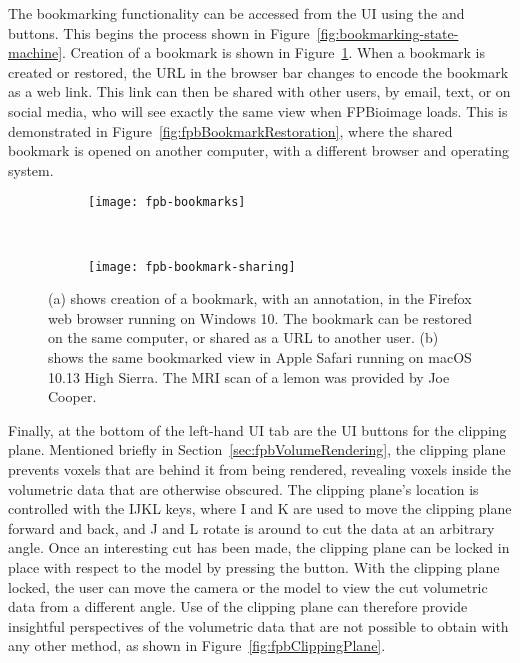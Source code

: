 The bookmarking functionality can be accessed from the UI using the  and  buttons.
This begins the process shown in Figure~\ref{fig:bookmarking-state-machine}.
Creation of a bookmark is shown in Figure~\ref{fig:fpbBookmarkCreation}.
When a bookmark is created or restored, the URL in the browser bar changes to encode the bookmark as a web link.
This link can then be shared with other users, by email, text, or on social media, who will see exactly the same view when FPBioimage loads.
This is demonstrated in Figure~\ref{fig:fpbBookmarkRestoration}, where the shared bookmark is opened on another computer, with a different browser and operating system.

\begin{figure}[htbp!]
\centering
\centering
\begin{subfigure}[b]{1.0\textwidth}
\texttt{[image: fpb-bookmarks]}
\caption{} \label{fig:fpbBookmarkCreation}
\end{subfigure}

~\newline
\begin{subfigure}[b]{1.0\textwidth}
\texttt{[image: fpb-bookmark-sharing]}
\caption{} \label{fig:fpbBookmarkRecieved}
\end{subfigure}
\caption[FPBioimage: Bookmarks can be shared as a URL for another user to open]{(a) shows creation of a bookmark, with an annotation, in the Firefox web browser running on Windows 10. The bookmark can be restored on the same computer, or shared as a URL to another user. (b) shows the same bookmarked view in Apple Safari running on macOS 10.13 High Sierra. The MRI scan of a lemon was provided by Joe Cooper. }
\label{fig:fpbBookmarks}
\end{figure}

Finally, at the bottom of the left-hand UI tab are the UI buttons for the clipping plane.
Mentioned briefly in Section~\ref{sec:fpbVolumeRendering}, the clipping plane prevents voxels that are behind it from being rendered, revealing voxels inside the volumetric data that are otherwise obscured.
The clipping plane's location is controlled with the IJKL keys, where I and K are used to move the clipping plane forward and back, and J and L rotate is around to cut the data at an arbitrary angle.
Once an interesting cut has been made, the clipping plane can be locked in place with respect to the model by pressing the  button.
With the clipping plane locked, the user can move the camera or the model to view the cut volumetric data from a different angle.
Use of the clipping plane can therefore provide insightful perspectives of the volumetric data that are not possible to obtain with any other method, as shown in Figure~\ref{fig:fpbClippingPlane}.

